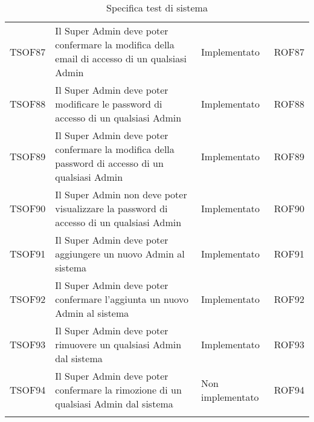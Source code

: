 \documentclass[../PianoDiQualifica_v3.0.0.tex]{subfiles}
\begin{document}
\begin{longtable}[c] { >{\centering\arraybackslash}p{2cm} p{7cm} >{\centering\arraybackslash}p{4cm} >{\centering\arraybackslash}p{2cm}}
			\addlinespace[0.3em]
			TSOF87 & Il Super Admin deve poter confermare la modifica della email di accesso di un qualsiasi Admin & Implementato & ROF87 \\
			\addlinespace[0.3em]
			\midrule
			\addlinespace[0.3em]
			TSOF88 & Il Super Admin deve poter modificare le password di accesso di un qualsiasi Admin & Implementato & ROF88 \\
			\addlinespace[0.3em]
			\midrule
			\addlinespace[0.3em]
			TSOF89 & Il Super Admin deve poter confermare la modifica della password di accesso di un qualsiasi Admin & Implementato & ROF89 \\
			\addlinespace[0.3em]
			\midrule
			\addlinespace[0.3em]
			TSOF90 & Il Super Admin non deve poter visualizzare la password di accesso di un qualsiasi Admin & Implementato & ROF90 \\
			\addlinespace[0.3em]
			\midrule
			\addlinespace[0.3em]
			TSOF91 & Il Super Admin deve poter aggiungere un nuovo Admin al sistema	 & Implementato & ROF91 \\
			\addlinespace[0.3em]
			\midrule
			\addlinespace[0.3em]
			TSOF92 & Il Super Admin deve poter confermare l'aggiunta un nuovo Admin al sistema & Implementato & ROF92 \\
			\addlinespace[0.3em]
			\midrule
			\addlinespace[0.3em]
			TSOF93 & Il Super Admin deve poter rimuovere un qualsiasi Admin dal sistema	 & Implementato & ROF93 \\
			\addlinespace[0.3em]
			\midrule
			\addlinespace[0.3em]
			TSOF94 & Il Super Admin deve poter confermare la rimozione di un qualsiasi Admin dal sistema & Non implementato & ROF94 \\
		\bottomrule
		\caption{Specifica test di sistema}
	\end{longtable}

	\newpage
\end{document}
